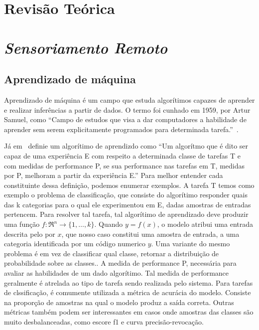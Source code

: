 \section{Revisão Teórica}\label{sec:Cap2_revisao_teorica}


\section{\textit{Sensoriamento Remoto}}\label{sec:Cap2_sensoriamento}



\subsection{Aprendizado de máquina}\label{sec:aprendizado_maquina}

Aprendizado de máquina é um campo que estuda algorítimos capazes de aprender e realizar inferências a partir de dados. O termo foi cunhado em 1959, por Artur Samuel, como “Campo de estudos que visa a dar computadores a habilidade de aprender sem serem explicitamente programados para determinada tarefa.”~\cite{Samuel1959SomeSI}.

Já em~\cite{Mitchell97} definie um algorítimo de aprendizdo como “Um algorítmo que é dito ser capaz de uma experiência E com respeito a determinada classe de tarefas T e com medidas de performance P, se sua performance nas tarefas em T, medidas por P, melhoram a partir da experiência E.” 
Para melhor entender cada constituinte dessa definição, podemos enumerar exemplos. A tarefa T temos como exemplo o problema de classificação, que consiste do algorítimo responder quais das k categorias para o qual ele experimentou em E, dadas amostras de entradas pertencem. Para resolver tal tarefa, tal algorítimo de aprendizado deve produzir uma função $f:\Re^n\rightarrow \{1,\ldots,k\}$. Quando $y=f(x)$, o modelo atribui uma entrada descrita pelo por $x$, que nosso caso constitui uma amostra de entrada, a uma categoria identificada por um código numerico $y$. Uma variante do mesmo problema é em vez de classificar qual classe, retornar a distribuição de probabilidade sobre as classes.\cite{GoodBengCour16}. A medida de performance P, necessária para avaliar as habilidades de um dado algorítimo. Tal medida de performance geralmente é atrelada ao tipo de tarefa sendo realizada pelo sistema. Para tarefas de clssificação, é comumente utilizada a métrica de acurácia do modelo. Consiste na proporção de amostras na qual o modelo produz a saída correta. Outras métricas também podem ser interessantes em casos onde amostras das classes são muito desbalanceadas, como escore f1 e curva precisão-revocação.




